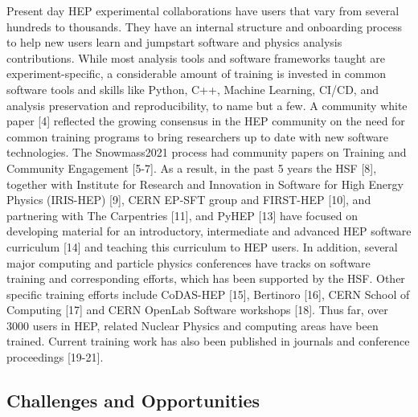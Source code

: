 Present day HEP experimental collaborations have users that vary from
several hundreds to thousands. They have an internal structure and
onboarding process to help new users learn and jumpstart software and
physics analysis contributions. While most analysis tools and software
frameworks taught are experiment-specific, a considerable amount of
training is invested in common software tools and skills like Python,
C++, Machine Learning, CI/CD, and analysis preservation and
reproducibility, to name but a few. A community white paper {[}4{]}
reflected the growing consensus in the HEP community on the need for
common training programs to bring researchers up to date with new
software technologies. The Snowmass2021 process had community papers on
Training and Community Engagement {[}5-7{]}. As a result, in the past 5
years the HSF {[}8{]}, together with Institute for Research and
Innovation in Software for High Energy Physics (IRIS-HEP) {[}9{]}, CERN
EP-SFT group and FIRST-HEP {[}10{]}, and partnering with The Carpentries
{[}11{]}, and PyHEP {[}13{]} have focused on developing material for an
introductory, intermediate and advanced HEP software curriculum {[}14{]}
and teaching this curriculum to HEP users. In addition, several major
computing and particle physics conferences have tracks on software
training and corresponding efforts, which has been supported by the HSF.
Other specific training efforts include CoDAS-HEP {[}15{]}, Bertinoro
{[}16{]}, CERN School of Computing {[}17{]} and CERN OpenLab Software
workshops {[}18{]}. Thus far, over 3000 users in HEP, related Nuclear
Physics and computing areas have been trained. Current training work has
also been published in journals and conference proceedings {[}19-21{]}.

\subsection{Challenges and
Opportunities}\label{challenges-and-opportunities}

